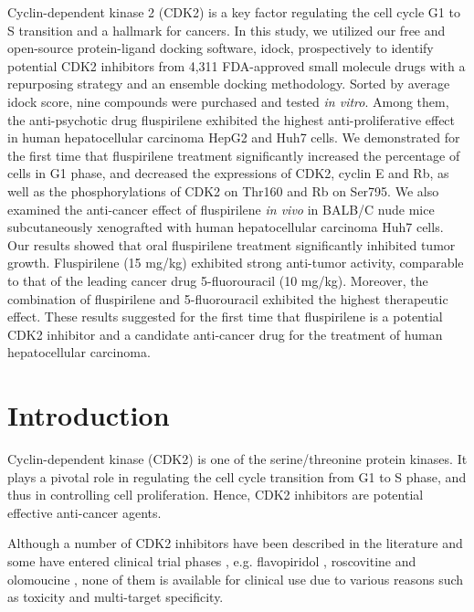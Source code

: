 \documentclass[10pt]{article}
\begin{document}
Cyclin-dependent kinase 2 (CDK2) is a key factor regulating the cell cycle G1 to S transition and a hallmark for cancers. In this study, we utilized our free and open-source protein-ligand docking software, idock, prospectively to identify potential CDK2 inhibitors from 4,311 FDA-approved small molecule drugs with a repurposing strategy and an ensemble docking methodology. Sorted by average idock score, nine compounds were purchased and tested \textit{in vitro}. Among them, the anti-psychotic drug fluspirilene exhibited the highest anti-proliferative effect in human hepatocellular carcinoma HepG2 and Huh7 cells. We demonstrated for the first time that fluspirilene treatment significantly increased the percentage of cells in G1 phase, and decreased the expressions of CDK2, cyclin E and Rb, as well as the phosphorylations of CDK2 on Thr160 and Rb on Ser795. We also examined the anti-cancer effect of fluspirilene \textit{in vivo} in BALB/C nude mice subcutaneously xenografted with human hepatocellular carcinoma Huh7 cells. Our results showed that oral fluspirilene treatment significantly inhibited tumor growth. Fluspirilene (15 mg/kg) exhibited strong anti-tumor activity, comparable to that of the leading cancer drug 5-fluorouracil (10 mg/kg). Moreover, the combination of fluspirilene and 5-fluorouracil exhibited the highest therapeutic effect. These results suggested for the first time that fluspirilene is a potential CDK2 inhibitor and a candidate anti-cancer drug for the treatment of human hepatocellular carcinoma.


\section*{Introduction}

Cyclin-dependent kinase (CDK2) is one of the serine/threonine protein kinases. It plays a pivotal role in regulating the cell cycle transition from G1 to S phase, and thus in controlling cell proliferation. Hence, CDK2 inhibitors are potential effective anti-cancer agents.

Although a number of CDK2 inhibitors have been described in the literature and some have entered clinical trial phases \cite{1603}, e.g. flavopiridol \cite{1596}, roscovitine \cite{1597} and olomoucine \cite{1598}, none of them is available for clinical use due to various reasons such as toxicity and multi-target specificity.
\end{document}
